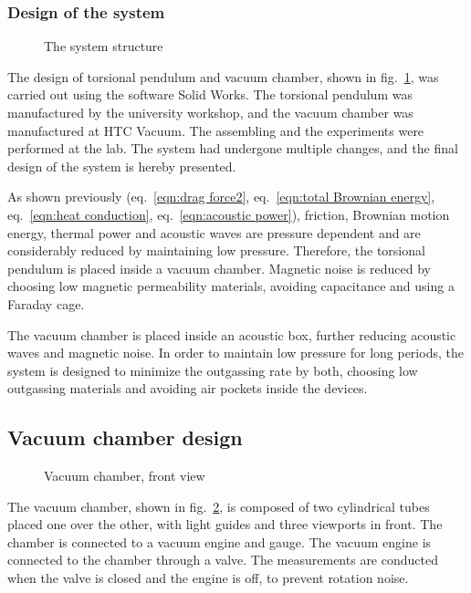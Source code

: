 \documentclass[\main/master.tex]{subfiles}
\begin{document}
\subsubsection{Design of the system}
\begin{figure}[htbp]
	\centering
	\caption[Total chamber]{The system structure}
	\label{fig:Total chamber}
\end{figure}
\FloatBarrier
\par\noindent
The design of torsional pendulum and vacuum chamber, shown in fig.~\ref{fig:Total chamber}, was carried out using the software Solid Works. The torsional pendulum was manufactured by the university workshop, and the vacuum chamber was manufactured at HTC Vacuum. The assembling and the experiments were performed at the lab. The system had undergone multiple changes, and the final design of the system is hereby presented. 
\par\noindent
As shown previously (eq.~\ref{eqn:drag force2}, eq.~\ref{eqn:total Brownian energy}, eq.~\ref{eqn:heat conduction}, eq.~\ref{eqn:acoustic power}), friction, Brownian motion energy, thermal power and acoustic waves are pressure dependent and are considerably reduced by maintaining low pressure. Therefore, the torsional pendulum is placed inside a vacuum chamber. Magnetic noise is reduced by choosing low magnetic permeability materials, avoiding capacitance and using a Faraday cage. 
\par\noindent
The vacuum chamber is placed inside an acoustic box, further reducing acoustic waves and magnetic noise. In order to maintain low pressure for long periods, the system is designed to minimize the outgassing rate by both, choosing low outgassing materials and avoiding air pockets inside the devices. 
\subsection{Vacuum chamber design}
\begin{figure}[htbp]
	\centering
	\caption[Vacuum chamber, front view]{Vacuum chamber, front view}
	\label{fig:chamber front}
\end{figure}
\FloatBarrier
\par\noindent
The vacuum chamber, shown in fig.~\ref{fig:chamber front}, is composed of two cylindrical tubes placed one over the other, with light guides and three viewports in front. The chamber is connected to a vacuum engine and gauge. The vacuum engine is connected to the chamber through a valve. The measurements are conducted when the valve is closed and the engine is off, to prevent rotation noise.
\end{document}

